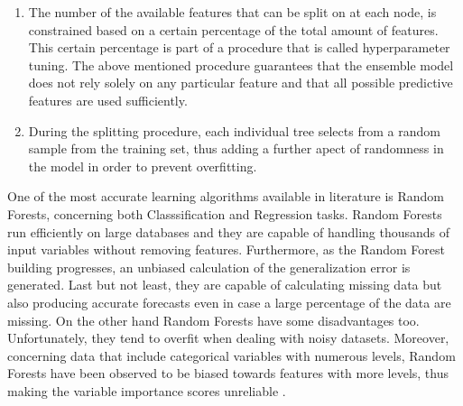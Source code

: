 \begin{enumerate}
    \item The number of the available features that can be split on at each node, is constrained based on a certain percentage of the total amount of features. This certain percentage is part of a procedure that is called hyperparameter tuning. The above mentioned procedure guarantees that the ensemble model does not rely solely on any particular feature and that all possible predictive features are used sufficiently.
    \item During the splitting procedure, each individual tree selects from a random sample from the training set, thus adding a further apect of randomness in the model in order to prevent overfitting.
\end{enumerate}
\par One of the most accurate learning algorithms available in literature is Random Forests, concerning both Classsification and Regression tasks. Random Forests run efficiently on large databases and they are capable of handling thousands of input variables without removing features.
Furthermore, as the Random Forest building progresses, an unbiased calculation of the generalization error is generated.
Last but not least, they are capable of calculating missing data but also producing accurate forecasts even in case a large percentage of the data are missing. On the other hand Random Forests have some disadvantages too. Unfortunately, they tend to overfit when dealing with noisy datasets. Moreover, concerning data that include categorical variables with numerous levels, Random Forests have been observed to be biased towards features with more levels, thus making the variable importance scores unreliable \cite{casella2013springer}.
